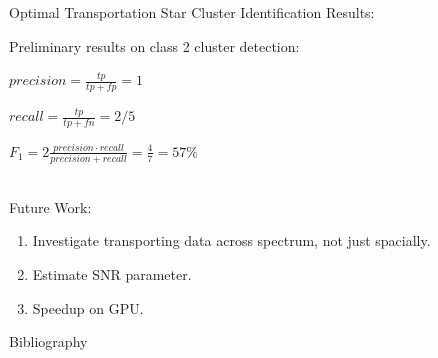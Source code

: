 \documentclass[10pt]{beamer}
\newcommand{\1}{{\mathbbm{1}}}
\begin{document}
\begin{frame}{Optimal Transportation Star Cluster Identification}
Results:

Preliminary results on class 2 cluster detection: \pause

$precision = \frac{tp}{tp+fp} = 1$

$recall = \frac{tp}{tp+fn} = 2/5$

$F_1 = 2 \frac{precision \cdot recall}{precision + recall} = \frac{4}{7} = 57\%$\\~\\

\pause

Future Work: \pause
\begin{enumerate}
    \item Investigate transporting data across spectrum, not just spacially. \pause
    \item Estimate SNR parameter. \pause
    \item Speedup on GPU. 
\end{enumerate}

\end{frame}

\begin{frame}{Bibliography}
    
    
    
    
\end{frame}
\end{document}
